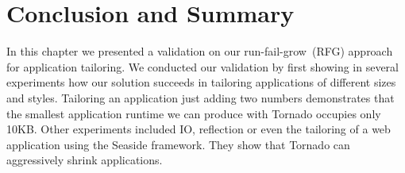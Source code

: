 %
%
%



\section{Conclusion and Summary}

In this chapter we presented a validation on our run-fail-grow~(RFG) approach for application tailoring. We conducted our validation by first showing in several experiments how our solution succeeds in tailoring applications of different sizes and styles. Tailoring an application just adding two numbers demonstrates that the smallest application runtime we can produce with Tornado occupies only 10KB. Other experiments included IO, reflection or even the tailoring of a web application using the Seaside framework. They show that Tornado can aggressively shrink applications.

